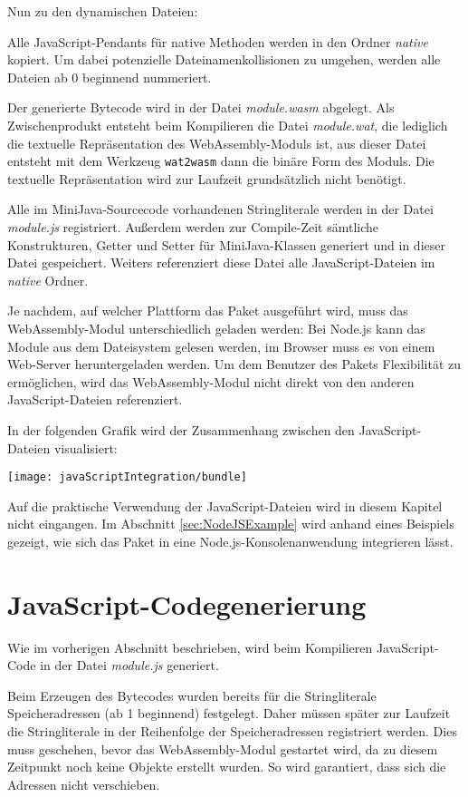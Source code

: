 Nun zu den dynamischen Dateien:

Alle JavaScript-Pendants für native Methoden werden in den Ordner \emph{native} kopiert. Um dabei potenzielle Dateinamenkollisionen zu umgehen, werden alle Dateien ab 0 beginnend nummeriert.

Der generierte Bytecode wird in der Datei \emph{module.wasm} abgelegt. Als Zwischenprodukt entsteht beim Kompilieren die Datei \emph{module.wat}, die lediglich die textuelle Repräsentation des WebAssembly-Moduls ist, aus dieser Datei entsteht mit dem Werkzeug \lstinline{wat2wasm}\cite{WABT} dann die binäre Form des Moduls. Die textuelle Repräsentation wird zur Laufzeit grundsätzlich nicht benötigt.

Alle im MiniJava-Sourcecode vorhandenen Stringliterale werden in der Datei \emph{module.js} registriert. Außerdem werden zur Compile-Zeit sämtliche Konstrukturen, Getter und Setter für MiniJava-Klassen generiert und in dieser Datei gespeichert. Weiters referenziert diese Datei alle JavaScript-Dateien im \emph{native} Ordner.

Je nachdem, auf welcher Plattform das Paket ausgeführt wird, muss das WebAssembly-Modul unterschiedlich geladen werden: Bei Node.js kann das Module aus dem Dateisystem gelesen werden, im Browser muss es von einem Web-Server heruntergeladen werden. Um dem Benutzer des Pakets  Flexibilität zu ermöglichen, wird das WebAssembly-Modul nicht direkt von den anderen JavaScript-Dateien referenziert.

In der folgenden Grafik wird der Zusammenhang zwischen den JavaScript-Dateien visualisiert:

\begin{center}
    \texttt{[image: javaScriptIntegration/bundle]}
\end{center}

Auf die praktische Verwendung der JavaScript-Dateien wird in diesem Kapitel nicht eingangen. Im Abschnitt \ref{sec:NodeJSExample} wird anhand eines Beispiels gezeigt, wie sich das Paket in eine Node.js-Konsolenanwendung integrieren lässt.

\section{JavaScript-Codegenerierung}

Wie im vorherigen Abschnitt beschrieben, wird beim Kompilieren JavaScript-Code in der Datei \emph{module.js} generiert.

Beim Erzeugen des Bytecodes wurden bereits für die Stringliterale Speicheradressen (ab 1 beginnend) festgelegt. Daher müssen später zur Laufzeit die Stringliterale in der Reihenfolge der Speicheradressen registriert werden. Dies muss geschehen, bevor das WebAssembly-Modul gestartet wird, da zu diesem Zeitpunkt noch keine Objekte erstellt wurden. So wird garantiert, dass sich die Adressen nicht verschieben.

